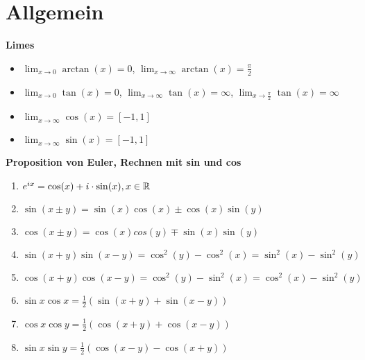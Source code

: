 \section{Allgemein}



\textbf{Limes}
\begin{itemize}
    \item $\lim_{x\to 0} \arctan(x) = 0$, $\lim_{x\to\infty} \arctan(x) = \frac{\pi}{2}$
    \item $\lim_{x\to 0} \tan(x) = 0$, $\lim_{x\to\infty} \tan(x) = \infty$, $\lim_{x\to\frac{\pi}{2}} \tan(x) = \infty$
    \item $\lim_{x\to\infty} \cos(x) = [-1, 1]$
    \item $\lim_{x\to\infty} \sin(x) = [-1, 1]$
\end{itemize}

\textbf{Proposition von Euler, Rechnen mit sin und cos}
\begin{enumerate}
    \item $e^{ix} = \cos(x) + i\cdot \sin(x), x\in\mathbb{R}$
    \item $\sin(x\pm y) = \sin(x)\cos(x) \pm \cos(x)\sin(y)$ 
    \item $\cos(x\pm y) = \cos(x)cos(y) \mp \sin(x)\sin(y)$
    \item $\sin(x+y)\sin(x-y) = \cos^2(y) - \cos^2(x) = \sin^2(x) - \sin^2(y)$
    \item $\cos(x+y)\cos(x-y) = \cos^2(y) - \sin^2(x) = \cos^2(x) - \sin^2(y)$
    \item $\sin{x}\cos{x} = \frac{1}{2}(\sin(x+y) + \sin(x-y))$ 
    \item $\cos{x}\cos{y} = \frac{1}{2}(\cos(x+y) + \cos(x-y))$
    \item  $\sin{x}\sin{y} = \frac{1}{2}(\cos(x-y)-\cos(x+y))$
\end{enumerate}

